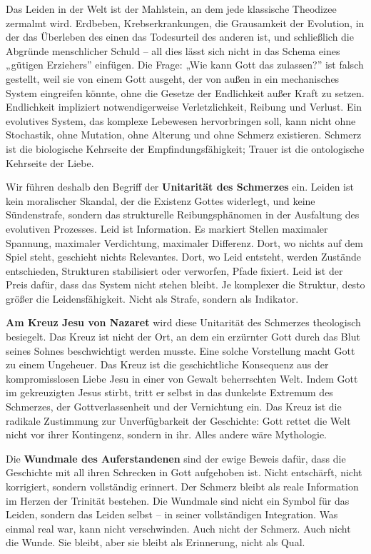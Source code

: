 \documentclass[
  ngerman,
]{article}
\begin{document}
Das Leiden in der Welt ist der Mahlstein, an dem jede klassische
Theodizee zermalmt wird. Erdbeben, Krebserkrankungen, die Grausamkeit
der Evolution, in der das Überleben des einen das Todesurteil des
anderen ist, und schließlich die Abgründe menschlicher Schuld -- all
dies lässt sich nicht in das Schema eines „gütigen Erziehers'' einfügen.
Die Frage: „Wie kann Gott das zulassen?'' ist falsch gestellt, weil sie
von einem Gott ausgeht, der von außen in ein mechanisches System
eingreifen könnte, ohne die Gesetze der Endlichkeit außer Kraft zu
setzen. Endlichkeit impliziert notwendigerweise Verletzlichkeit, Reibung
und Verlust. Ein evolutives System, das komplexe Lebewesen hervorbringen
soll, kann nicht ohne Stochastik, ohne Mutation, ohne Alterung und ohne
Schmerz existieren. Schmerz ist die biologische Kehrseite der
Empfindungsfähigkeit; Trauer ist die ontologische Kehrseite der Liebe.

Wir führen deshalb den Begriff der \textbf{Unitarität des Schmerzes}
ein. Leiden ist kein moralischer Skandal, der die Existenz Gottes
widerlegt, und keine Sündenstrafe, sondern das strukturelle
Reibungsphänomen in der Ausfaltung des evolutiven Prozesses. Leid ist
Information. Es markiert Stellen maximaler Spannung, maximaler
Verdichtung, maximaler Differenz. Dort, wo nichts auf dem Spiel steht,
geschieht nichts Relevantes. Dort, wo Leid entsteht, werden Zustände
entschieden, Strukturen stabilisiert oder verworfen, Pfade fixiert. Leid
ist der Preis dafür, dass das System nicht stehen bleibt. Je komplexer
die Struktur, desto größer die Leidensfähigkeit. Nicht als Strafe,
sondern als Indikator.

\textbf{Am Kreuz Jesu von Nazaret} wird diese Unitarität des Schmerzes
theologisch besiegelt. Das Kreuz ist nicht der Ort, an dem ein erzürnter
Gott durch das Blut seines Sohnes beschwichtigt werden musste. Eine
solche Vorstellung macht Gott zu einem Ungeheuer. Das Kreuz ist die
geschichtliche Konsequenz aus der kompromisslosen Liebe Jesu in einer
von Gewalt beherrschten Welt. Indem Gott im gekreuzigten Jesus stirbt,
tritt er selbst in das dunkelste Extremum des Schmerzes, der
Gottverlassenheit und der Vernichtung ein. Das Kreuz ist die radikale
Zustimmung zur Unverfügbarkeit der Geschichte: Gott rettet die Welt
nicht vor ihrer Kontingenz, sondern in ihr. Alles andere wäre
Mythologie.

Die \textbf{Wundmale des Auferstandenen} sind der ewige Beweis dafür,
dass die Geschichte mit all ihren Schrecken in Gott aufgehoben ist.
Nicht entschärft, nicht korrigiert, sondern vollständig erinnert. Der
Schmerz bleibt als reale Information im Herzen der Trinität bestehen.
Die Wundmale sind nicht ein Symbol für das Leiden, sondern das Leiden
selbst -- in seiner vollständigen Integration. Was einmal real war, kann
nicht verschwinden. Auch nicht der Schmerz. Auch nicht die Wunde. Sie
bleibt, aber sie bleibt als Erinnerung, nicht als Qual.
\end{document}
